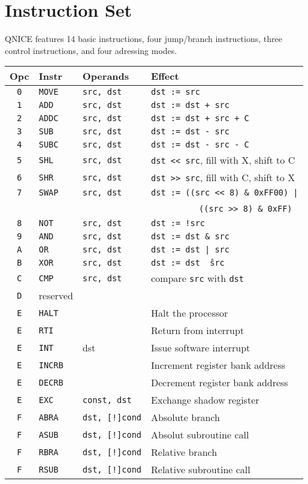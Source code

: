 \documentclass{leaflet}
\begin{document}
 \section{Instruction Set}
  QNICE features 14 basic instructions, four jump/branch instructions, three
  control instructions, and four adressing modes.
  \vspace*{-3mm}
  {\scriptsize
   \begin{center}
    \begin{longtable}{|c|ll|l|}
     \hline
      $\!\!\!$Opc$\!\!\!$&Instr&Operands&Effect\\
     \hline
     \hline
      {\tt 0}&{\tt MOVE}&{\tt src, dst}&{\tt dst := src}\\
      {\tt 1}&{\tt ADD}&{\tt src, dst}&{\tt dst := dst + src}\\
      {\tt 2}&{\tt ADDC}&{\tt src, dst}&{\tt dst := dst + src + C}\\
      {\tt 3}&{\tt SUB}&{\tt src, dst}&{\tt dst := dst - src}\\
      {\tt 4}&{\tt SUBC}&{\tt src, dst}&{\tt dst := dst - src - C}\\
      {\tt 5}&{\tt SHL}&{\tt src, dst}&{\tt dst << src}, fill with X, shift to C\\
      {\tt 6}&{\tt SHR}&{\tt src, dst}&{\tt dst >> src}, fill with C, shift to X\\
      {\tt 7}&{\tt SWAP}&{\tt src, dst}&{\tt dst := ((src << 8) \& 0xFF00) |}\\
             &          &              &~~~~~~~~~~{\tt ((src >> 8) \& 0xFF)}\\
      {\tt 8}&{\tt NOT}&{\tt src, dst}&{\tt dst := !src}\\
      {\tt 9}&{\tt AND}&{\tt src, dst}&{\tt dst := dst \& src}\\
      {\tt A}&{\tt OR}&{\tt src, dst}&{\tt dst := dst | src}\\
      {\tt B}&{\tt XOR}&{\tt src, dst}&{\tt dst := dst \^\ src}\\
      {\tt C}&{\tt CMP}&{\tt src, dst}&compare {\tt src} with {\tt dst}\\
      {\tt D}&reserved&&\\
      {\tt E}&{\tt HALT}&&Halt the processor\\
      {\tt E}&{\tt RTI}&&Return from interrupt\\
      {\tt E}&{\tt INT}&dst&Issue software interrupt\\
      {\tt E}&{\tt INCRB}&&Increment register bank address\\
      {\tt E}&{\tt DECRB}&&Decrement register bank address\\
      {\tt E}&{\tt EXC}&{\tt const, dst}&Exchange shadow register\\
      {\tt F}&{\tt ABRA}&{\tt dst, [!]cond}&Absolute branch\\
      {\tt F}&{\tt ASUB}&{\tt dst, [!]cond}&Absolut subroutine call\\
      {\tt F}&{\tt RBRA}&{\tt dst, [!]cond}&Relative branch\\
      {\tt F}&{\tt RSUB}&{\tt dst, [!]cond}&Relative subroutine call\\
     \hline
    \end{longtable}
   \end{center}
  }
%
\end{document}
